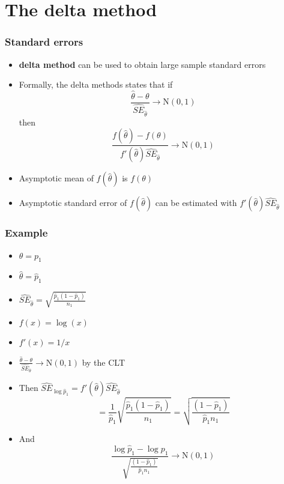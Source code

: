 \documentclass[aspectratio=169]{beamer}
\begin{document}
\section{The delta method}
\begin{frame}\frametitle{Standard errors}
\begin{itemize}
\item {\bf delta method} can be used to obtain large sample standard errors
\item Formally, the delta methods states that if 
  $$
  \frac{\hat \theta - \theta}{\hat{SE}_{\hat \theta}} \rightarrow \mathrm{N}(0, 1)
  $$
  then
  $$
  \frac{f(\hat \theta) - f(\theta)}{f'(\hat \theta) \hat{SE}_{\hat \theta}}
  \rightarrow \mathrm{N}(0, 1)
  $$
\item Asymptotic mean of $f(\hat \theta)$ is $f(\theta)$
\item Asymptotic standard error of $f(\hat \theta)$ can be
  estimated with $f'(\hat \theta) \hat{SE}_{\hat \theta}$
\end{itemize}
\end{frame}

\begin{frame}\frametitle{Example}
  \begin{itemize}
  \item $\theta = p_1$
  \item $\hat \theta = \hat p_1$
  \item $\hat{SE}_{\hat \theta} = \sqrt{\frac{\hat p_1 (1 - \hat p_1)}{n_1}}$
  \item $f(x) = \log(x)$ 
  \item $f'(x) = 1 / x$
  \item $\frac{\hat \theta - \theta}{\hat{SE}_{\hat \theta}} \rightarrow \mathrm{N}(0,1)$ by the CLT 
  \item Then $\hat{SE}_{\log \hat p_1} = f'(\hat \theta) \hat{SE}_{\hat \theta}$
    $$ = \frac{1}{\hat p_1}  \sqrt{\frac{\hat p_1 (1 - \hat p_1)}{ n_1}} = \sqrt{\frac{(1 - \hat p_1)}{\hat p_1 n_1}}$$
  \item And 
    $$
    \frac{\log \hat p_1 - \log p_1}{ \sqrt{\frac{(1 - \hat p_1)}{\hat p_1 n_1}}} 
    \rightarrow \mathrm{N}(0,1)
    $$
  \end{itemize}
\end{frame}
\end{document}
